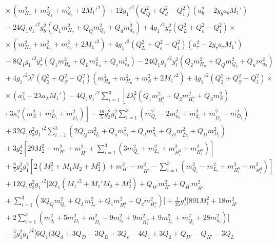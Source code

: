 \documentclass[preprint,amsmath,amssymb,aps,superscriptaddress,prd,showpacs,floatfix,nofootinbib]{revtex4-1}
\begin{document}
\begin{subequations}
\begin{align}
&{}\times\left ( m_{H_d}^2+m_{Q_3}^2+m_{d_3}^2+2M_1'^2\right )+12g_1'^2\left ( Q_Q^2+Q_d^2-Q_1^2\right )\left ( a_b^2-2y_ba_bM_1'\right )\nonumber\\
&{}-24Q_1g_1'^2y_b^2\left ( Q_1m_{H_d}^2+Q_Qm_{Q_3}^2+Q_dm_{d_3}^2\right )+4g_1'^2y_\tau^2\left ( Q_L^2+Q_e^2-Q_1^2\right )\times\nonumber\\
&{}\times\left ( m_{H_d}^2+m_{L_3}^2+m_{e_3}^2+2M_1'^2\right )+4g_1'^2\left ( Q_L^2+Q_e^2-Q_1^2\right )\left ( a_\tau^2-2y_\tau a_\tau M_1'\right )\nonumber\\
&{}-8Q_1g_1'^2y_\tau^2\left ( Q_1m_{H_d}^2+Q_Lm_{L_3}^2+Q_em_{e_3}^2\right )-24Q_1g_1'^2y_t^2\left ( Q_2m_{H_u}^2+Q_Qm_{Q_3}^2+Q_um_{u_3}^2\right )\nonumber\\
&{}+4g_1'^2\lambda^2\left ( Q_2^2+Q_S^2-Q_1^2\right )\left ( m_{H_d}^2+m_{H_u}^2+m_S^2+2M_1'^2\right )+4g_1'^2\left ( Q_2^2+Q_S^2-Q_1^2\right )\times\nonumber\\
&{}\times\left ( a_\lambda^2-2\lambda a_\lambda M_1'\right )-4Q_1g_1'^2\sum_{i=1}^3\left [ 2\lambda_i^2\left ( Q_1m_{H_i^d}^2+Q_2m_{H_i^u}^2+Q_Sm_S^2\right )\right.\nonumber\\
&{}\left.+3\kappa_i^2\left ( m_S^2+m_{D_i}^2+m_{\overline{D}_i}^2\right )\right ]-\frac{16}{5}g_3^2g_1^2\sum_{i=1}^3\left ( m_{Q_i}^2-2m_{u_i}^2+m_{d_i}^2+m_{\overline{D}_i}^2-m_{D_i}^2\right )\nonumber\\
&{}+32Q_1g_3^2g_1'^2\sum_{i=1}^3\left ( 2Q_Qm_{Q_i}^2+Q_um_{u_i}^2+Q_dm_{d_i}^2+Q_{\overline{D}}m_{\overline{D}_i}^2+Q_Dm_{D_i}^2\right )\nonumber\\
&{}+3g_2^4\left [ 29M_2^2+m_{H'}^2+m_{\overline{H'}}^2+\sum_{i=1}^3\left ( 3m_{Q_i}^2+m_{L_i}^2+m_{H_i^d}^2+m_{H_i^u}^2\right )\right ]\nonumber\\
&{}+\frac{9}{5}g_2^2g_1^2\left [ 2\left ( M_1^2+M_1M_2+M_2^2\right )+m_{H'}^2-m_{\overline{H'}}^2-\sum_{i=1}^3\left ( m_{Q_i}^2-m_{L_i}^2+m_{H_i^u}^2-m_{H_i^d}^2\right )\right ]\nonumber\\
&{}+12Q_1g_2^2g_1'^2\bigg [ 2Q_1\left ( M_1'^2+M_1'M_2+M_2^2\right )+Q_{H'}m_{H'}^2+Q_{\overline{H'}}m_{\overline{H'}}^2\nonumber\\
&{}+\sum_{i=1}^3\left ( 3Q_Qm_{Q_i}^2+Q_Lm_{L_i}^2+Q_1m_{H_i^d}^2+Q_2m_{H_i^u}^2\right )\bigg ]+\frac{1}{25}g_1^4\bigg [ 891M_1^2+18m_{H'}^2\nonumber\\
&{}+2\sum_{i=1}^3\left ( m_{d_i}^2+5m_{D_i}^2+m_{\overline{D}_i}^2-9m_{e_i}^2+9m_{H_i^d}^2+9m_{L_i}^2+m_{Q_i}^2+28m_{u_i}^2\right )\bigg ]\nonumber\\
&{}-\frac{4}{5}g_1^2g_1'^2\bigg [ 6Q_1\big ( 3Q_d+3Q_{\overline{D}}-3Q_D+3Q_e-4Q_1+3Q_2+Q_{\overline{H'}}-Q_{H'}-3Q_L\nonumber\\

\end{align}
\end{subequations}
\end{document}

